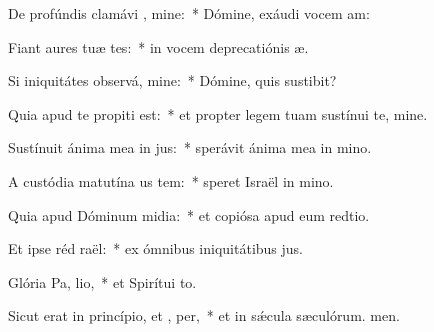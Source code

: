 \item De profúndis clamávi  , mine:~* Dómine, exáudi vocem am:
\item Fiant aures tuæ tes:~* in vocem deprecatiónis æ.
\item Si iniquitátes observá, mine:~* Dómine, quis sustibit?
\item Quia apud te propiti est:~* et propter legem tuam sustínui te, mine.
\item Sustínuit ánima mea in  jus:~* sperávit ánima mea in mino.
\item A custódia matutína us  tem:~* speret Israël in mino.
\item Quia apud Dóminum midia:~* et copiósa apud eum redtio.
\item Et ipse réd raël:~* ex ómnibus iniquitátibus jus.
\item Glória Pa,  lio,~* et Spirítui to.
\item Sicut erat in princípio, et ,  per,~* et in sǽcula sæculórum. men.

